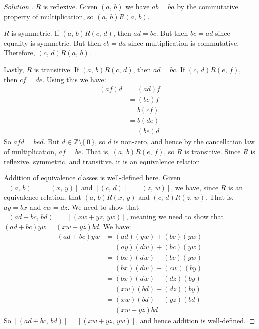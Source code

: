 \documentclass{article}
\theoremstyle{normal}
\begin{document}
    \color{black}
    \begin{proof}[Solution.]
        $R$ is reflexive. Given $(a,\,b)$ we have $ab=ba$ by the commutative
        property of multiplication, so $(a,\,b)R(a,\,b)$.
        \par\hfill\par
        $R$ is symmetric. If $(a,\,b)R(c,\,d)$, then $ad=bc$. But then
        $bc=ad$ since equality is symmetric. But then
        $cb=da$ since multiplication is commutative. Therefore,
        $(c,\,d)R(a,\,b)$.
        \par\hfill\par
        Lastly, $R$ is transitive. If $(a,\,b)R(c,\,d)$, then
        $ad=bc$. If $(c,\,d)R(e,\,f)$, then $cf=de$. Using this we have:
        \begin{align}
            (af)d
            &=(ad)f\tag{Associativity and Commutativity}\\
            &=(bc)f\tag{Substitution}\\
            &=b(cf)\tag{Associativity}\\
            &=b(de)\tag{Substitution}\\
            &=(be)d\tag{Associativity and Commutativity}
        \end{align}
        So $afd=bed$. But $d\in\mathbb{Z}\setminus\{\,0\,\}$, so $d$ is
        non-zero, and hence by the cancellation law of multiplication,
        $af=be$. That is, $(a,\,b)R(e,\,f)$, so $R$ is transitive. Since
        $R$ is reflexive, symmetric, and transitive, it is an equivalence
        relation.
        \par\hfill\par
        Addition of equivalence classes is well-defined here. Given
        $[(a,\,b)]=[(x,\,y)]$ and $[(c,\,d)]=[(z,\,w)]$, we have, since $R$ is
        an equivalence relation, that $(a,\,b)R(x,\,y)$ and
        $(c,\,d)R(z,\,w)$. That is, $ay=bx$ and $cw=dz$. We need to show that
        $[(ad+bc,\,bd)]=[(xw+yz,\,yw)]$, meaning we need to show that
        $(ad+bc)yw=(xw+yz)bd$. We have:
        \begin{align}
            (ad+bc)yw
            &=(ad)(yw)+(bc)(yw)\tag{Distributivity}\\
            &=(ay)(dw)+(bc)(yw)\tag{Associativity and Commutativity}\\
            &=(bx)(dw)+(bc)(yw)\tag{Substitution}\\
            &=(bx)(dw)+(cw)(by)\tag{Associativity and Commutativity}\\
            &=(bx)(dw)+(dz)(by)\tag{Substitution}\\
            &=(xw)(bd)+(dz)(by)\tag{Associativity and Commutativity}\\
            &=(xw)(bd)+(yz)(bd)\tag{Associativity and Commutativity}\\
            &=(xw+yz)bd\tag{Distributivity}
        \end{align}
        So $[(ad+bc,\,bd)]=[(xw+yz,\,yw)]$, and hence addition is well-defined.
    \end{proof}
\end{document}
